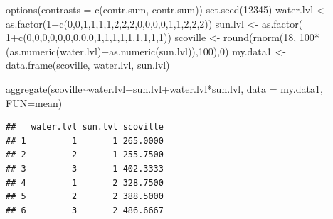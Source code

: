 \documentclass[
]{book}
\newenvironment{Shaded}{\begin{snugshade}}{\end{snugshade}}
\newcommand{\AttributeTok}[1]{\textcolor[rgb]{0.77,0.63,0.00}{#1}}
\newcommand{\DecValTok}[1]{\textcolor[rgb]{0.00,0.00,0.81}{#1}}
\newcommand{\FunctionTok}[1]{\textcolor[rgb]{0.00,0.00,0.00}{#1}}
\newcommand{\NormalTok}[1]{#1}
\newcommand{\OtherTok}[1]{\textcolor[rgb]{0.56,0.35,0.01}{#1}}
\newcommand{\SpecialCharTok}[1]{\textcolor[rgb]{0.00,0.00,0.00}{#1}}
\newcommand{\StringTok}[1]{\textcolor[rgb]{0.31,0.60,0.02}{#1}}
\begin{document}
\begin{Shaded}
\begin{Highlighting}[]
\FunctionTok{options}\NormalTok{(}\AttributeTok{contrasts =} \FunctionTok{c}\NormalTok{(}\StringTok{\textquotesingle{}contr.sum\textquotesingle{}}\NormalTok{, }\StringTok{\textquotesingle{}contr.sum\textquotesingle{}}\NormalTok{))}
\FunctionTok{set.seed}\NormalTok{(}\DecValTok{12345}\NormalTok{)}
\NormalTok{water.lvl }\OtherTok{\textless{}{-}} \FunctionTok{as.factor}\NormalTok{(}\DecValTok{1}\SpecialCharTok{+}\FunctionTok{c}\NormalTok{(}\DecValTok{0}\NormalTok{,}\DecValTok{0}\NormalTok{,}\DecValTok{1}\NormalTok{,}\DecValTok{1}\NormalTok{,}\DecValTok{1}\NormalTok{,}\DecValTok{1}\NormalTok{,}\DecValTok{2}\NormalTok{,}\DecValTok{2}\NormalTok{,}\DecValTok{2}\NormalTok{,}\DecValTok{0}\NormalTok{,}\DecValTok{0}\NormalTok{,}\DecValTok{0}\NormalTok{,}\DecValTok{0}\NormalTok{,}\DecValTok{1}\NormalTok{,}\DecValTok{1}\NormalTok{,}\DecValTok{2}\NormalTok{,}\DecValTok{2}\NormalTok{,}\DecValTok{2}\NormalTok{))}
\NormalTok{sun.lvl }\OtherTok{\textless{}{-}} \FunctionTok{as.factor}\NormalTok{(  }\DecValTok{1}\SpecialCharTok{+}\FunctionTok{c}\NormalTok{(}\DecValTok{0}\NormalTok{,}\DecValTok{0}\NormalTok{,}\DecValTok{0}\NormalTok{,}\DecValTok{0}\NormalTok{,}\DecValTok{0}\NormalTok{,}\DecValTok{0}\NormalTok{,}\DecValTok{0}\NormalTok{,}\DecValTok{0}\NormalTok{,}\DecValTok{0}\NormalTok{,}\DecValTok{1}\NormalTok{,}\DecValTok{1}\NormalTok{,}\DecValTok{1}\NormalTok{,}\DecValTok{1}\NormalTok{,}\DecValTok{1}\NormalTok{,}\DecValTok{1}\NormalTok{,}\DecValTok{1}\NormalTok{,}\DecValTok{1}\NormalTok{,}\DecValTok{1}\NormalTok{))}
\NormalTok{scoville }\OtherTok{\textless{}{-}} \FunctionTok{round}\NormalTok{(}\FunctionTok{rnorm}\NormalTok{(}\DecValTok{18}\NormalTok{, }\DecValTok{100}\SpecialCharTok{*}\NormalTok{(}\FunctionTok{as.numeric}\NormalTok{(water.lvl)}\SpecialCharTok{+}\FunctionTok{as.numeric}\NormalTok{(sun.lvl)),}\DecValTok{100}\NormalTok{),}\DecValTok{0}\NormalTok{)}
\NormalTok{my.data1 }\OtherTok{\textless{}{-}} \FunctionTok{data.frame}\NormalTok{(scoville, water.lvl, sun.lvl)}

\FunctionTok{aggregate}\NormalTok{(scoville}\SpecialCharTok{\textasciitilde{}}\NormalTok{water.lvl}\SpecialCharTok{+}\NormalTok{sun.lvl}\SpecialCharTok{+}\NormalTok{water.lvl}\SpecialCharTok{*}\NormalTok{sun.lvl, }\AttributeTok{data =}\NormalTok{ my.data1, }\AttributeTok{FUN=}\NormalTok{mean)}
\end{Highlighting}
\end{Shaded}

\begin{verbatim}
##   water.lvl sun.lvl scoville
## 1         1       1 265.0000
## 2         2       1 255.7500
## 3         3       1 402.3333
## 4         1       2 328.7500
## 5         2       2 388.5000
## 6         3       2 486.6667
\end{verbatim}
\end{document}
